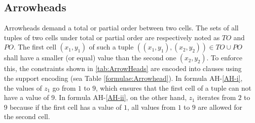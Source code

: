 \clearpage

\subsection{Arrowheads}\label{Encoding:Arrowheads}
Arrowheads demand a total or partial order between two cells. The sets of all tuples of two cells under total or partial order are respectively noted as $TO$ and $PO$. The first cell $(x_1,y_1)$ of such a tuple  $((x_1,y_1), (x_2,y_2)) \in TO \cup PO$ shall have a smaller (or equal) value than the second one $(x_2,y_2)$. To enforce this, the constraints shown in \ref{tab:ArrowHeads} are encoded into clauses using the support encoding (sea Table \ref{formulae:Arrowhead}). In formula AH-\ref{AH-i}, the values of $z_1$ go from $1$ to $9$, which ensures that the first cell of a tuple can not have a value of 9. In formula AH-\ref{AH-ii}, on the other hand, $z_1$ iterates from $2$ to $9$ because if the first cell has a value of $1$, all values from $1$ to $9$ are allowed for the second cell.\\

